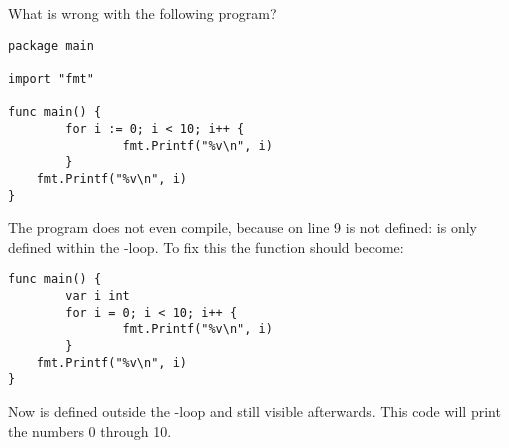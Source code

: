 \begin{Exercise}[title={Scope},difficulty=1]
\label{ex:scope}
\Question\label{ex:scope q1} What is wrong with the following program?

\begin{lstlisting}[numbers=right]
package main

import "fmt"
                                                                                                   
func main() {
        for i := 0; i < 10; i++ {
                fmt.Printf("%v\n", i)
        }
	fmt.Printf("%v\n", i)
}
\end{lstlisting}

\end{Exercise}

\begin{Answer}
\Question
The program does not even compile, because  on line 9 is
not defined:  is only defined within the -loop. To fix
this the function  should become:
\begin{lstlisting}[numbers=none]
func main() {
        var i int
        for i = 0; i < 10; i++ {
                fmt.Printf("%v\n", i)
        }
	fmt.Printf("%v\n", i)
}
\end{lstlisting}
Now  is defined outside the -loop and still visible
afterwards. This code will print the numbers 0 through 10.
\end{Answer}
